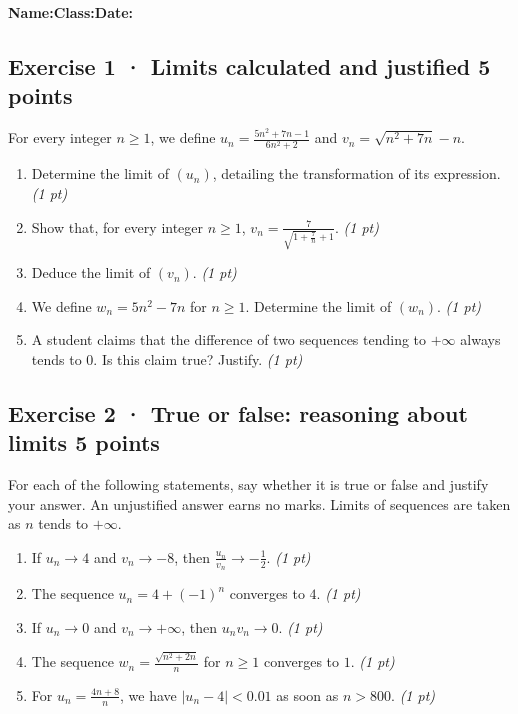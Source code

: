 \smallskip\textbf{Name:}\enspace\dotfill\quad\textbf{Class:}\enspace\dotfill\quad\textbf{Date:}\enspace\dotfill

\subsection*{Exercise 1 · Limits calculated and justified \hfill 5 points}For every integer $n\ge1$, we define $u_n=\frac{5n^2+7n-1}{6n^2+2}$ and $v_n=\sqrt{n^2+7n}-n$.

\begin{enumerate}

\item Determine the limit of $(u_n)$, detailing the transformation of its expression. \hfill\textit{(1 pt)}

\item Show that, for every integer $n\ge1$, $v_n=\frac{7}{\sqrt{1+\frac{7}n}+1}$. \hfill\textit{(1 pt)}

\item Deduce the limit of $(v_n)$. \hfill\textit{(1 pt)}

\item We define $w_n=5n^2-7n$ for $n\ge1$. Determine the limit of $(w_n)$. \hfill\textit{(1 pt)}

\item A student claims that the difference of two sequences tending to $+\infty$ always tends to $0$. Is this claim true? Justify. \hfill\textit{(1 pt)}

\end{enumerate}

\subsection*{Exercise 2 · True or false: reasoning about limits \hfill 5 points}For each of the following statements, say whether it is true or false and justify your answer. An unjustified answer earns no marks. Limits of sequences are taken as $n$ tends to $+\infty$.

\begin{enumerate}

\item If $u_n\to 4$ and $v_n\to-8$, then $\frac{u_n}{v_n}\to-\frac{1}{2}$. \hfill\textit{(1 pt)}

\item The sequence $u_n=4+(-1)^n$ converges to $4$. \hfill\textit{(1 pt)}

\item If $u_n\to0$ and $v_n\to+\infty$, then $u_nv_n\to0$. \hfill\textit{(1 pt)}

\item The sequence $w_n=\frac{\sqrt{n^2+2n}}{n}$ for $n\ge1$ converges to $1$. \hfill\textit{(1 pt)}

\item For $u_n=\frac{4n+8}{n}$, we have $|u_n-4|<\num{0,01}$ as soon as $n> 800$. \hfill\textit{(1 pt)}

\end{enumerate}

